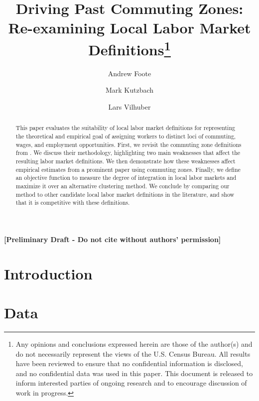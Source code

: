 \documentclass[12pt]{article}
\begin{document}
\title{Driving Past Commuting Zones: Re-examining Local Labor Market Definitions\thanks{Any opinions and conclusions expressed herein are those of the author(s) and do not necessarily represent the views of the U.S. Census Bureau. All results have been reviewed to ensure that no confidential information is disclosed, and no confidential data was used in this paper. This document is released to inform interested parties of ongoing research and to encourage discussion of work in progress.}}
\author[1]{Andrew Foote}
\author[1]{Mark Kutzbach}
\author[1,2]{Lars Vilhuber}
\maketitle


\textbf{[Preliminary Draft - Do not cite without authors' permission]}


\begin{abstract}
This paper evaluates the suitability of local labor market definitions for representing the theoretical and empirical goal of assigning workers to distinct loci of commuting, wages, and employment opportunities. First, we revisit the commuting zone definitions from \citet{TS1996}. We discuss their methodology, highlighting two main weaknesses that affect the resulting labor market definitions. We then demonstrate how these weaknesses affect empirical estimates from a prominent paper using commuting zones. Finally, we define an objective function to measure the degree of integration in local labor markets and maximize it over an alternative clustering method. We conclude by comparing our method to other candidate local labor market definitions in the literature, and show that it is competitive with these definitions.
\end{abstract}


\doublespacing

\section{Introduction}





\section{Data \label{sec:data}}
\end{document}
